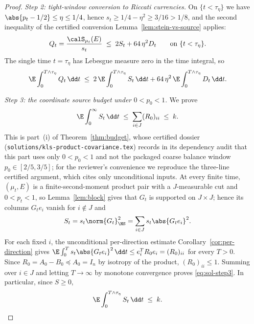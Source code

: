 \documentclass[../main.tex]{subfiles}
\begin{document}
\begin{proof}
\medskip
\emph{Step 2: tight-window conversion to Riccati currencies.}
On $\{t<\tau_\eta\}$ we have $\abs{p_t-1/2}\le\eta\le1/4$, hence
$s_t\ge1/4-\eta^2\ge3/16>1/8$, and the second inequality of the certified conversion
Lemma~\ref{lem:stein-vs-source} applies:
\[
  Q_t=\frac{\calS_{\mu_t}(E)}{s_t}\;\le\;2S_t+64\,\eta^2D_t
  \qquad\text{on }\{t<\tau_\eta\}.
\]
The single time $t=\tau_\eta$ has Lebesgue measure zero in the time integral, so
\begin{equation}
\label{eq:sol-step2}
  \E\int_0^{T\wedge\tau_\eta}Q_t\,\dd t
  \;\le\;2\,\E\int_0^{T\wedge\tau_\eta}S_t\,\dd t
        +64\,\eta^2\,\E\int_0^{T\wedge\tau_\eta}D_t\,\dd t .
\end{equation}

\medskip
\emph{Step 3: the coordinate source budget under $0<p_0<1$.}
We prove
\begin{equation}
\label{eq:sol-step3}
  \E\int_0^\infty S_t\,\dd t\;\le\;\sum_{i\in J}(R_0)_{ii}\;\le\;k .
\end{equation}
This is part~(i) of Theorem~\ref{thm:budget}, whose certified dossier
(\texttt{solutions/kls-product-covariance.tex}) records in its dependency audit that this part
uses only $0<p_0<1$ and not the packaged coarse balance window $p_0\in[2/5,3/5]$; for the
reviewer's convenience we reproduce the three-line certified argument, which cites only
unconditional inputs.  At every finite time, $(\mu_t,E)$ is a finite-second-moment product
pair with a $J$-measurable cut and $0<p_t<1$, so Lemma~\ref{lem:block} gives that $G_t$ is
supported on $J\times J$; hence its columns $G_te_i$ vanish for $i\notin J$ and
\[
  S_t=s_t\norm{G_t}_\HS^2=\sum_{i\in J}s_t\abs{G_te_i}^2 .
\]
For each fixed $i$, the unconditional per-direction estimate
Corollary~\ref{cor:per-direction} gives
$\E\int_0^Ts_t\abs{G_te_i}^2\,\dd t\le e_i^TR_0e_i=(R_0)_{ii}$ for every $T>0$.  Since
$R_0=A_0-B_0\preceq A_0=I_n$ by isotropy of the product, $(R_0)_{ii}\le1$.  Summing over
$i\in J$ and letting $T\to\infty$ by monotone convergence proves
\eqref{eq:sol-step3}.  In particular, since $S\ge0$,
\begin{equation}
\label{eq:sol-step3b}
  \E\int_0^{T\wedge\tau_\eta}S_t\,\dd t\;\le\;k .
\end{equation}


\end{proof}
\end{document}
